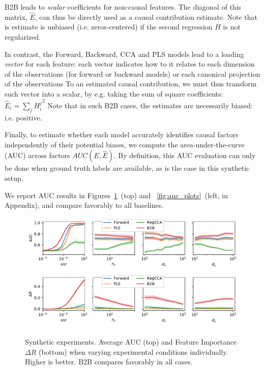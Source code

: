 %
B2B leads to \emph{scalar} coefficients for non-causal
features. The diagonal of this matrix, $\hat E$, can thus be directly used
as a causal contribution estimate. Note that is estimate is unbiased (i.e.
zeros-centered) if the second regression $H$ is not regularized.

In contrast, the Forward, Backward, CCA and PLS models lead to a
loading \emph{vector} for each feature: each vector indicates how to it
relates to each dimension of the observations (for forward or backward
models) or each canonical projection of the observations
To an estimated causal contribution, we must thus transform such vector into a
scalar, by e.g. taking the sum of square coefficients:
  $\hat E_i = \sum_j {H^j_i}^2 $
Note that in such B2B cases, the estimates are necessarily biased: i.e. positive.

Finally, to estimate whether each model accurately identifies causal factors independently of
their potential biases, we compute the
area-under-the-curve (AUC) across factors $AUC(E, \hat E)$.
By definition, this AUC evaluation can only be done when ground truth labels are available, as is the case in
this synthetic setup.

We report AUC results in Figures~\ref{fig:percondition}~(top) and ~\ref{fig:auc_plots}~(left, in Appendix), and compare favorably to all baselines.

\begin{figure}[t]
  \centering
  \includegraphics[width=\linewidth]{figures/auc_condition.pdf}
  \includegraphics[width=\linewidth]{figures/r_in_condition.pdf}
  \vspace{-4ex}
  \caption{Synthetic experiments. Average AUC (top) and Feature Importance
  $\Delta R$ (bottom) when varying experimental conditions individually.
  Higher is better. B2B compares favorably in all cases.
  \label{fig:percondition}}
\end{figure}


